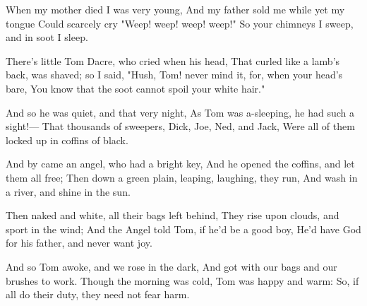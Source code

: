 
\begin{poem}

\begin{stanza}
When my mother died I was very young,\verseline
And my father sold me while yet my tongue\verseline
Could scarcely cry "Weep! weep! weep! weep!"\verseline
So your chimneys I sweep, and in soot I sleep.
\end{stanza}
\begin{stanza}
\verseindent There's little Tom Dacre, who cried when his head,\verseline
That curled like a lamb's back, was shaved; so I said,\verseline
"Hush, Tom! never mind it, for, when your head's bare,\verseline
You know that the soot cannot spoil your white hair."
\end{stanza}
\begin{stanza}
\verseindent And so he was quiet, and that very night,\verseline
As Tom was a-sleeping, he had such a sight!—\verseline
That thousands of sweepers, Dick, Joe, Ned, and Jack,\verseline
Were all of them locked up in coffins of black.
\end{stanza}
\begin{stanza}
\verseindent And by came an angel, who had a bright key,\verseline
And he opened the coffins, and let them all free;\verseline
Then down a green plain, leaping, laughing, they run,\verseline
And wash in a river, and shine in the sun.
\end{stanza}
\begin{stanza}
\verseindent Then naked and white, all their bags left behind,\verseline
They rise upon clouds, and sport in the wind;\verseline
And the Angel told Tom, if he'd be a good boy,\verseline
He'd have God for his father, and never want joy.
\end{stanza}
\begin{stanza}
\verseindent And so Tom awoke, and we rose in the dark,\verseline
And got with our bags and our brushes to work.\verseline
Though the morning was cold, Tom was happy and warm:\verseline
So, if all do their duty, they need not fear harm.
\end{stanza}

\end{poem}